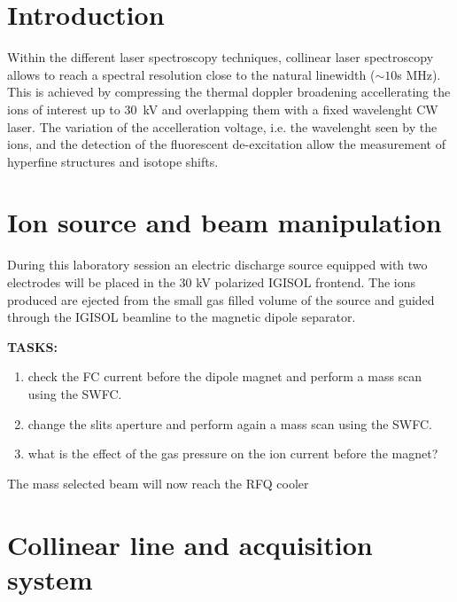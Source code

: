 \documentclass[a4paper,12pt]{article}
\begin{document}


\section{Introduction}
Within the different laser spectroscopy techniques, collinear laser spectroscopy allows to reach a spectral resolution close to the natural linewidth ($\sim 10$s MHz).
This is achieved by compressing the thermal doppler broadening accellerating the ions of interest up to 30~kV and overlapping them with a fixed wavelenght CW laser.
The variation of the accelleration voltage, i.e. the wavelenght seen by the ions, and the detection of the fluorescent de-excitation allow the measurement of hyperfine structures and isotope shifts.

\section{Ion source and beam manipulation}
During this laboratory session an electric discharge source equipped with two electrodes will be placed in the 30 kV polarized IGISOL frontend.
The ions produced are ejected from the small gas filled volume of the source and guided through the IGISOL beamline to the magnetic dipole separator.

\textbf{TASKS:}
\begin{enumerate}
    \item check the FC current before the dipole magnet and perform a mass scan using the SWFC.
    \item change the slits aperture and perform again a mass scan using the SWFC.
    \item what is the effect of the gas pressure on the ion current before the magnet?
\end{enumerate}

The mass selected beam will now reach the RFQ cooler



\section{Collinear line and acquisition system}


\clearpage
\end{document}

